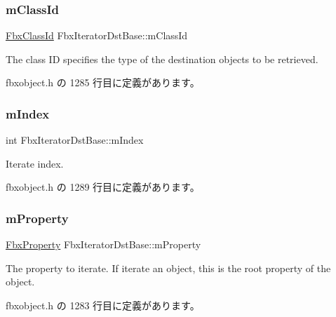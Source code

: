 \subsubsection{\texorpdfstring{m\+Class\+Id}{mClassId}}
{\footnotesize\ttfamily \hyperlink{class_fbx_class_id}{Fbx\+Class\+Id} Fbx\+Iterator\+Dst\+Base\+::m\+Class\+Id\hspace{0.3cm}{\ttfamily [protected]}}

The class ID specifies the type of the destination objects to be retrieved. 

 fbxobject.\+h の 1285 行目に定義があります。

\mbox{\label{class_fbx_iterator_dst_base_ad24255785c3869f0c76d37aa4cedf6aa}} 
\subsubsection{\texorpdfstring{m\+Index}{mIndex}}
{\footnotesize\ttfamily int Fbx\+Iterator\+Dst\+Base\+::m\+Index\hspace{0.3cm}{\ttfamily [protected]}}

Iterate index. 

 fbxobject.\+h の 1289 行目に定義があります。

\mbox{\label{class_fbx_iterator_dst_base_a3f4bd3e4d6427c2183c2fae3c3cc3033}} 
\subsubsection{\texorpdfstring{m\+Property}{mProperty}}
{\footnotesize\ttfamily \hyperlink{class_fbx_property}{Fbx\+Property} Fbx\+Iterator\+Dst\+Base\+::m\+Property\hspace{0.3cm}{\ttfamily [protected]}}

The property to iterate. If iterate an object, this is the root property of the object. 

 fbxobject.\+h の 1283 行目に定義があります。

\mbox{\label{class_fbx_iterator_dst_base_a9bac54bd7497f350e9a7f8be88d711eb}} 
